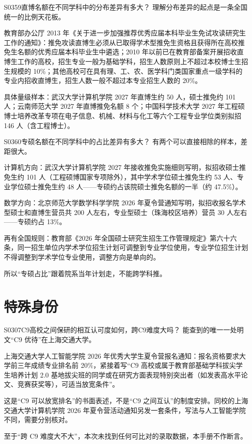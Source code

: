 \begin{qa}{S0359}{直博名额在不同学科中的分布差异有多大？}
理解分布差异的起点是一条全国统一的比例天花板。

教育部办公厅 2013 年《关于进一步加强推荐优秀应届本科毕业生免试攻读研究生工作的通知》：推免攻读直博生必须从已取得学术型推免生资格且获得所在高校推免生名额的优秀应届本科毕业生中遴选；2010 年以前已在教育部备案开展招收直博生工作的高校，招生专业一般为基础学科，招生人数原则上不超过本校博士生招生规模的 10\%；其他高校可在具有理、工、农、医学科门类国家重点一级学科的专业内招收直博生，招生人数一般不超过本专业招生人数的 20\%。

具体量级样本：武汉大学计算机学院 2027 年直博生约 50 人，硕士推免约 101 人；云南师范大学 2027 年直博推免名额 8 个；中国科学技术大学 2027 年工程硕博士培养改革专项在电子信息、机械、材料与化工等六个工程专业学位类别拟招 146 人（含工程博士）。
\end{qa}

\begin{qa}{S0360}{专硕名额在不同学科中的占比差异有多大？}
有两个可以直接相除的样本，差距很大。

计算机方向：武汉大学计算机学院 2027 年接收推免实施细则写明，拟招收硕士推免生约 101 人（工程硕博国家专项除外），其中学术学位硕士推免生约 53 人、专业学位硕士推免生约 48 人——专硕约占该院硕士推免名额的一半（约 47.5\%）。

数学方向：北京师范大学数学科学学院 2026 年夏令营通知写明，拟招收报名学术型硕士和直博生营员共 200 人左右，专业型硕士（珠海校区培养）营员 30 人左右——专硕约占 13\%。

再有全国规则：教育部《2026 年全国硕士研究生招生工作管理规定》第六十六条，同一招生单位内学术学位招生计划可调整到专业学位使用，专业学位招生计划不得调整到学术学位专业使用，调整方向是单向的。

所以“专硕占比”跟着院系当年计划走，不能跨学科推。
\end{qa}

\section{特殊身份}
\begin{qa}{S0307}{C9高校之间保研的相互认可度如何，跨C9难度大吗？}
能查到的唯一一处明文“C9 优待”在上海交通大学。

上海交通大学人工智能学院 2026 年优秀大学生夏令营报名通知：报名资格要求大学前三年成绩专业排名前 20\%，紧接着写“C9 高校或属于教育部基础学科拔尖学生培养计划 2.0 基地拔尖班的同学或在研究方面表现特别突出者（如发表高水平论文、竞赛获奖等），可适当放宽条件”。

这是“C9 可以放宽排名”的书面表述，不是“C9 之间互认”的制度安排。同校的上海交通大学计算机学院 2026 年夏令营活动通知另发一套条件，写法与人工智能学院不同，需要分别核对。

至于“跨 C9 难度大不大”，本次未找到任何可比对的录取数据，本手册不作断言。
\end{qa}

